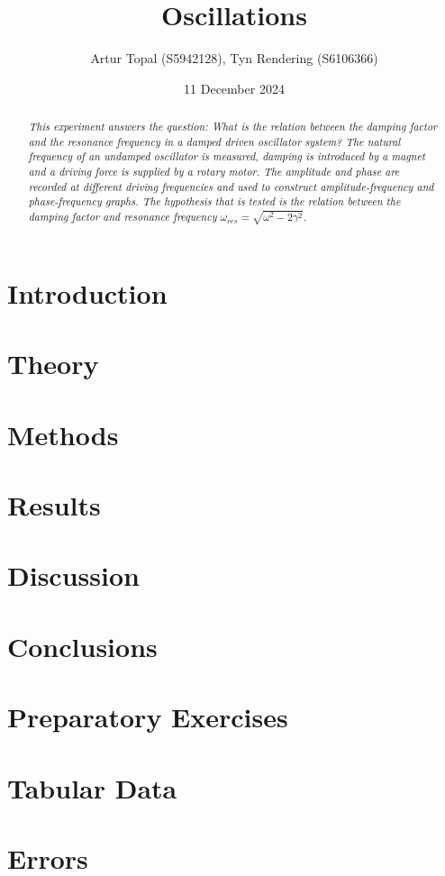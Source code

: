 \documentclass[a4paper,12pt]{article}
\title{Oscillations}
\author{Artur Topal (S5942128), Tyn Rendering (S6106366)}
\date{11 December 2024}
\begin{document}
\begin{titlingpage}
  \centering
  \maketitle
  \vspace{2cm}
  \begin{abstract}
  \textit{This experiment answers the question: What is the relation between the damping factor and the resonance frequency in a damped driven oscillator system? The natural frequency of an undamped oscillator is measured, damping is introduced by a magnet and a driving force is supplied by a rotary motor. The amplitude and phase are recorded at different driving frequencies and used to construct amplitude-frequency and phase-frequency graphs. The hypothesis that is tested is the relation between the damping factor and resonance frequency $\omega_{res} = \sqrt{\omega^2 - 2\gamma^2}$.}
\end{abstract}

\end{titlingpage}

\break
\tableofcontents
\break
\section{Introduction}


\section{Theory} \label{sec:theory}


\section{Methods}


\section{Results}


\section{Discussion}


\section{Conclusions}


\appendix
\section{Preparatory Exercises} \label{appendix:preps}

 
\section{Tabular Data} \label{appendix:data}


\section{Errors} \label{appendix:errors}

\end{document}
